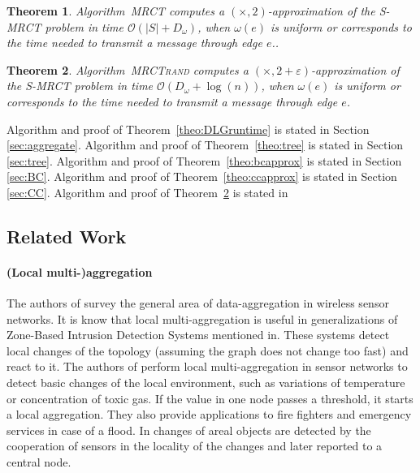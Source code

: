 \documentclass[11pt]{article}
\newcommand{\BO}{\mathcal{O}}
\newtheorem{theorem}{Theorem}[section]
\newif\iffull
\newif\ifshort
\begin{document}
\begin{theorem}
Algorithm\iffull~\ref{alg:MRCT}\fi~\textsc{MRCT} computes a $(\times,2)$-approximation of the S-MRCT problem in time $\BO(|S|+D_\omega)$, when $\omega(e)$ is uniform or corresponds to the time needed to transmit a message through edge $e$..
\label{theo:mrctapprox}
\end{theorem}
\begin{theorem}\label{theo:mrctapprox-rand}
Algorithm~\textsc{MRCTrand} computes a $(\times,2+\varepsilon)$-approximation of the S-MRCT problem in time $\BO(D_\omega + \log(n))$, when $\omega(e)$ is uniform or corresponds to the time needed to transmit a message through edge $e$.
\end{theorem}
Algorithm and proof of Theorem~\ref{theo:DLGruntime} is stated in Section \ref{sec:aggregate}.
Algorithm and proof of Theorem~\ref{theo:tree} is stated in Section \ref{sec:tree}.
Algorithm and proof of Theorem~\ref{theo:bcapprox} is stated in Section \ref{sec:BC}.
Algorithm and proof of Theorem~\ref{theo:ccapprox} is stated in Section \ref{sec:CC}.
Algorithm and proof of Theorem~\ref{theo:mrctapprox-rand} is stated in
\ifshort
Appendix \ref{FULL:app:MRCT}.
\fi
\iffull
Section \ref{app:MRCT}.
\fi


\subsection{Related Work}

\paragraph{(Local multi-)aggregation}
The authors of \cite{rajagopalan8data} survey the general area of data-aggregation in wireless sensor networks.
It is know \cite{anantvalee2007survey} that local multi-aggregation is useful in generalizations of Zone-Based Intrusion Detection Systems mentioned in. These systems detect local changes of the topology (assuming the graph does not change too fast) and react to it. The authors of \cite{Jiang:2008:DBT:1463434.1463440} perform local multi-aggregation in sensor networks to detect basic changes of the local environment, such as variations of temperature or concentration of toxic gas. If the value in one node passes a threshold, it starts a local aggregation. They also provide applications to fire fighters and emergency services in case of a flood. In \cite{Jiang:2008:DBT:1463434.1463440} changes of areal objects are detected by the cooperation of sensors in the locality of the changes and later reported to a central node.
\end{document}
